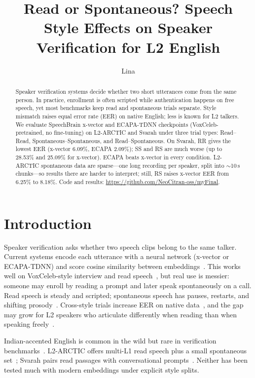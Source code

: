 \documentclass[cameraready]{Interspeech}
\title{Read or Spontaneous? Speech Style Effects on Speaker Verification for L2 English}
\author[affiliation={1}]{Lina}{Na}
\begin{document}
\maketitle

\begin{abstract}
Speaker verification systems decide whether two short utterances come from the same person. In practice, enrollment is often scripted while authentication happens on free speech, yet most benchmarks keep read and spontaneous trials separate. Style mismatch raises equal error rate (EER) on native English; less is known for L2 talkers. We evaluate SpeechBrain x-vector and ECAPA-TDNN checkpoints (VoxCeleb-pretrained, no fine-tuning) on L2-ARCTIC and Svarah under three trial types: Read--Read, Spontaneous--Spontaneous, and Read--Spontaneous. On Svarah, RR gives the lowest EER (x-vector 6.09\%, ECAPA 2.09\%); SS and RS are much worse (up to 28.53\% and 25.09\% for x-vector). ECAPA beats x-vector in every condition. L2-ARCTIC spontaneous data are sparse---one long recording per speaker, split into $\sim$10\,s chunks---so results there are harder to interpret; still, RS raises x-vector EER from 6.25\% to 8.18\%. Code and results: \url{https://github.com/NeoCitran-oss/myFinal}.
\end{abstract}

\section{Introduction}
\label{sec:intro}

Speaker verification asks whether two speech clips belong to the same talker. Current systems encode each utterance with a neural network (x-vector or ECAPA-TDNN) and score cosine similarity between embeddings~\cite{snyder2018xvector,desplanques2020ecapa}. This works well on VoxCeleb-style interview and read speech~\cite{chung2018voxceleb,desplanques2020ecapa}, but real use is messier: someone may enroll by reading a prompt and later speak spontaneously on a call. Read speech is steady and scripted; spontaneous speech has pauses, restarts, and shifting prosody~\cite{kenny2014style}. Cross-style trials increase EER on native data~\cite{tom2010style,park2018style,javali2024style,martinek2025read}, and the gap may grow for L2 speakers who articulate differently when reading than when speaking freely~\cite{zhao2018l2arctic}.

Indian-accented English is common in the wild but rare in verification benchmarks~\cite{javed2023svarah}. L2-ARCTIC offers multi-L1 read speech plus a small spontaneous set~\cite{zhao2018l2arctic}; Svarah pairs read passages with conversational prompts~\cite{javed2023svarah}. Neither has been tested much with modern embeddings under explicit style splits.
\end{document}
